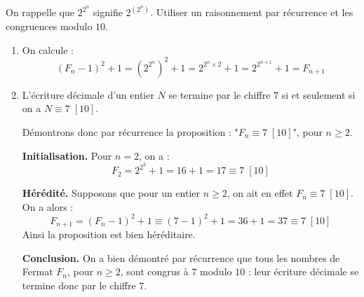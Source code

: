 \documentclass[11pt,class=report,crop=false]{standalone}
\begin{document}
\indication
On rappelle que $2^{2^n}$ signifie $2^{(2^n)}$.
Utiliser un raisonnement par récurrence et les congruences modulo $10$.
\finindication

\correction
\sauteligne
\begin{enumerate}
\item On calcule :
$$ (F_{n}-1)^2+1 = (2^{2^n})^2 + 1 = 2^{2^n \times 2} + 1 = 2^{2^{n+1}} + 1 = F_{n+1} $$
\item L'écriture décimale d'un entier $N$ se termine par le chiffre $7$ si et seulement si on a $N \equiv 7 \; [10]$.

Démontrons donc par récurrence la proposition : "$F_n \equiv 7 \; [10]$", pour $n\ge2$.

\textbf{Initialisation.} Pour $n=2$, on a :
$$ F_2 = 2^{2^2} + 1 = 16+1 = 17 \equiv 7 \; [10] $$

\textbf{Hérédité.} Supposons que pour un entier $n \geq 2$, on ait en effet $F_n \equiv 7 \; [10]$. On a alors :
$$ F_{n+1} = (F_n - 1)^2 + 1 \equiv (7-1)^2+1 = 36 + 1 = 37 \equiv 7 \; [10] $$
Ainsi la proposition est bien héréditaire.

\textbf{Conclusion.} On a bien démontré par récurrence que tous les nombres de Fermat $F_n$, pour $n \geq 2$, sont congrus à $7$ modulo $10$ : leur écriture décimale se termine donc par le chiffre $7$.

\end{enumerate}
\fincorrection
\finexercice
\end{document}
